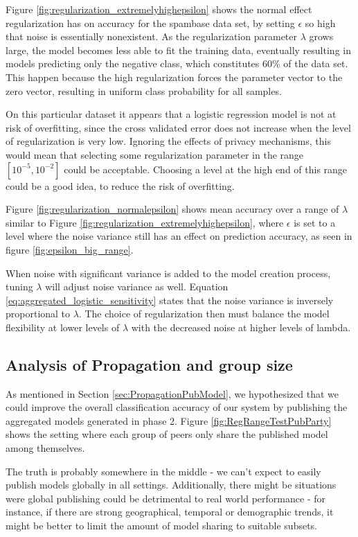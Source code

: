 Figure \ref{fig:regularization_extremelyhighepsilon} shows the normal effect regularization has on accuracy for the spambase data set, by setting $\epsilon$ so high that noise is essentially nonexistent. As the regularization parameter $\lambda$ grows large, the model becomes less able to fit the training data, eventually resulting in models predicting only the negative class, which constitutes 60\% of the data set. This happen because the high regularization forces the parameter vector to the zero vector, resulting in uniform class probability for all samples. 

On this particular dataset it appears that a logistic regression model is not at risk of overfitting, since the cross validated error does not increase when the level of regularization is very low. Ignoring the effects of privacy mechanisms, this would mean that selecting some regularization parameter in the range $[10^{-5},10^{-2}]$ could be acceptable. Choosing a level at the high end of this range could be a good idea, to reduce the risk of overfitting.


Figure \ref{fig:regularization_normalepsilon} shows mean accuracy over a range of $\lambda$ similar to Figure \ref{fig:regularization_extremelyhighepsilon}, where $\epsilon$ is set to a level where the noise variance still has an effect on prediction accuracy, as seen in figure \ref{fig:epsilon_big_range}.

When noise with significant variance is added to the model creation process, tuning $\lambda$ will adjust noise variance as well. Equation \ref{eq:aggregated_logistic_sensitivity} states that the noise variance is inversely proportional to $\lambda$. The choice of regularization then must balance the model flexibility at lower levels of $\lambda$ with the decreased noise at higher levels of lambda.


\subsection{Analysis of Propagation and group size}

As mentioned in Section \ref{sec:PropagationPubModel}, we hypothesized that we could improve the overall classification accuracy of our system by publishing the aggregated models generated in phase 2. Figure \ref{fig:RegRangeTestPubParty} shows the setting where each group of peers only share the published model among themselves.

The truth is probably somewhere in the middle - we can't expect to easily publish models globally in all settings. Additionally, there might be situations were global publishing could be detrimental to real world performance - for instance, if there are strong geographical, temporal or demographic trends, it might be better to limit the amount of model sharing to suitable subsets.

